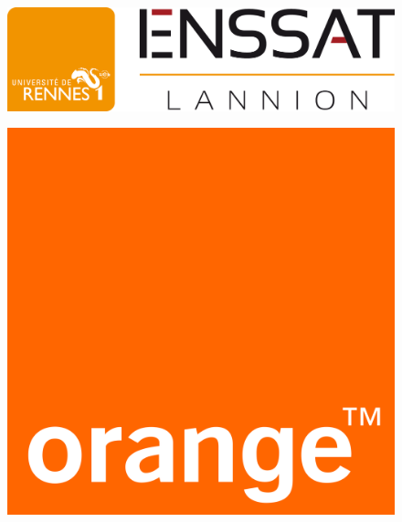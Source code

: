 \begin{titlepage}
  \begin{sffamily}
  \begin{center}
    \captionsetup[figure]{list=no}
    \begin{figure}
      \begin{minipage}[c]{.46\linewidth}
	\href{http://enssat.fr}{\includegraphics[scale=0.15]{images/logo_ecole.png}}
      \end{minipage} \hfill
      \begin{minipage}[c]{.46\linewidth}
	\begin{flushright}
	  \href{http://orange.fr}{\includegraphics[scale=0.028]{images/logo_company.png}}
	\end{flushright}
      \end{minipage} \\[0.5cm]
      \captionsetup{labelformat=empty}
      \caption{ }
      \captionsetup{labelformat=default}
    \end{figure}
    \captionsetup[figure]{list=yes}


\end{center}
\end{sffamily}
\end{titlepage}
